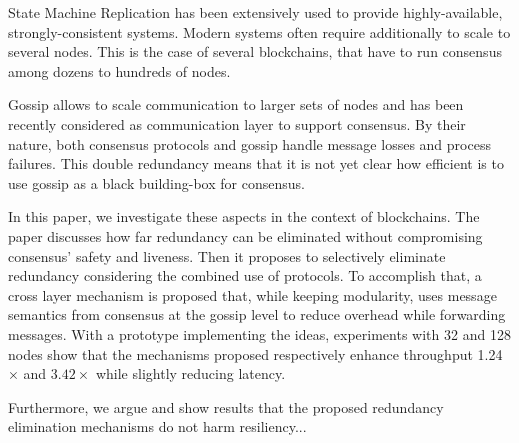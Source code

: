 %
%
%
%
%
State Machine Replication has been extensively used to provide highly-available, strongly-consistent systems.  Modern systems often require additionally to scale to several nodes.  This is the case of 
several blockchains, that have to run consensus among dozens to hundreds of nodes.

Gossip allows to scale communication to larger sets of nodes and has been recently considered as communication layer to support consensus.
%
By their nature, both consensus protocols and gossip handle message losses and process failures.   This double redundancy means that it is not yet clear how efficient is to use gossip as a black building-box for consensus.

In this paper, we investigate these aspects in the context of blockchains.
%
The paper discusses how far redundancy can be eliminated without compromising consensus' safety and liveness.
%
Then it proposes to selectively eliminate redundancy considering the combined use of protocols.
%
To accomplish that, a cross layer mechanism is proposed that, while keeping modularity, uses message semantics from consensus at the gossip level to reduce overhead while forwarding messages.   With a prototype implementing the ideas, experiments with 32 and 128 nodes show that the mechanisms proposed respectively enhance throughput 1.24 $\times$ and  $3.42 \times$ while slightly reducing latency.  

Furthermore, we argue and show results that the proposed redundancy elimination mechanisms do not harm resiliency...




